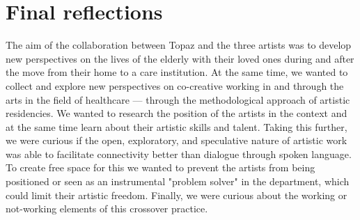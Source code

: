 \documentclass[authordate, empirical,issue]{jote-new-article}
\begin{document}
	\section{Final reflections}
	\begin{originalPurpose}
		The aim of the collaboration between Topaz and the three artists was to develop new perspectives on the lives of the elderly with their loved ones during and after the move from their home to a care institution. At the same time, we wanted to collect and explore new perspectives on co-creative working in and through the arts in the field of healthcare — through the methodological approach of artistic residencies. We wanted to research the position of the artists in the context and at the same time learn about their artistic skills and talent. Taking this further, we were curious if the open, exploratory, and speculative nature of artistic work was able to facilitate connectivity better than dialogue through spoken language. To create free space for this we wanted to prevent the artists from being positioned or seen as an instrumental "problem solver" in the department, which could limit their artistic freedom. Finally, we were curious about the working or not-working elements of this crossover practice.
	\end{originalPurpose}
\end{document}

